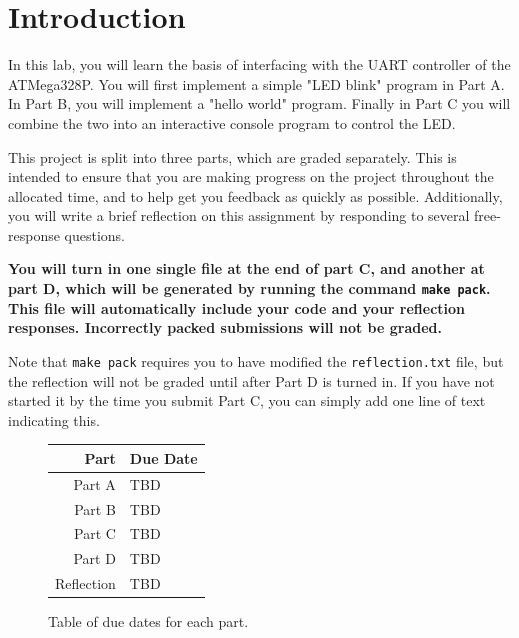 \documentclass{article}
\begin{document}
\section{Introduction}

In this lab, you will learn the basis of interfacing with the UART controller
of the ATMega328P. You will first implement a simple "LED blink" program in
Part A. In Part B, you will implement a "hello world" program. Finally in Part
C you will combine the two into an interactive console program to control the
LED.

This project is split into three parts, which are graded separately. This is
intended to ensure that you are making progress on the project throughout the
allocated time, and to help get you feedback as quickly as possible.
Additionally, you will write a brief reflection on this assignment by
responding to several free-response questions.

\textbf{You will turn in one single file at the end of part C, and another at
part D, which will be generated by running the command \texttt{make pack}. This
file will automatically include your code and your reflection responses.
Incorrectly packed submissions will not be graded.}

Note that \texttt{make pack} requires you to have modified the
\texttt{reflection.txt} file, but the reflection will not be graded until after
Part D is turned in. If you have not started it by the time you submit Part C,
you can simply add one line of text indicating this.

\begin{figure}[H]

	\centering

	\begin{tabular}{r|l}

		Part & Due Date \\ \hline\hline
		Part A & TBD \\ \hline
		Part B & TBD \\ \hline
		Part C & TBD \\ \hline
		Part D & TBD \\ \hline
		Reflection & TBD \\ \hline

	\end{tabular}

	\caption{Table of due dates for each part.}

\end{figure}

\tableofcontents
\end{document}
